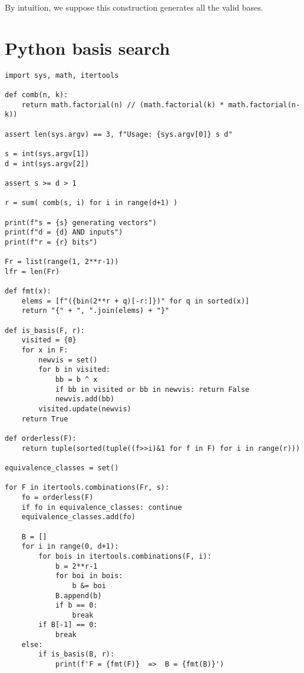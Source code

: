 \documentclass[11pt]{llncs}
\begin{document}
By intuition, we suppose this construction generates all the valid bases.

\appendix

\section{Python basis search}

\small
\begin{lstlisting}[basicstyle=\ttfamily]
import sys, math, itertools

def comb(n, k):
	return math.factorial(n) // (math.factorial(k) * math.factorial(n-k))

assert len(sys.argv) == 3, f"Usage: {sys.argv[0]} s d"

s = int(sys.argv[1])
d = int(sys.argv[2])

assert s >= d > 1

r = sum( comb(s, i) for i in range(d+1) )

print(f"s = {s} generating vectors")
print(f"d = {d} AND inputs")
print(f"r = {r} bits")

Fr = list(range(1, 2**r-1))
lfr = len(Fr)

def fmt(x):
	elems = [f"({bin(2**r + q)[-r:]})" for q in sorted(x)]
	return "{" + ", ".join(elems) + "}"

def is_basis(F, r):
	visited = {0}
	for x in F:
		newvis = set()
		for b in visited:
			bb = b ^ x
			if bb in visited or bb in newvis: return False
			newvis.add(bb)
		visited.update(newvis)
	return True

def orderless(F):
	return tuple(sorted(tuple((f>>i)&1 for f in F) for i in range(r)))

equivalence_classes = set()

for F in itertools.combinations(Fr, s):
	fo = orderless(F)
	if fo in equivalence_classes: continue
	equivalence_classes.add(fo)

	B = []
	for i in range(0, d+1):
		for bois in itertools.combinations(F, i):
			b = 2**r-1
			for boi in bois:
				b &= boi
			B.append(b)
			if b == 0:
				break
		if B[-1] == 0:
			break
	else:
		if is_basis(B, r):
			print(f'F = {fmt(F)}  =>  B = {fmt(B)}')
\end{lstlisting}
\end{document}
